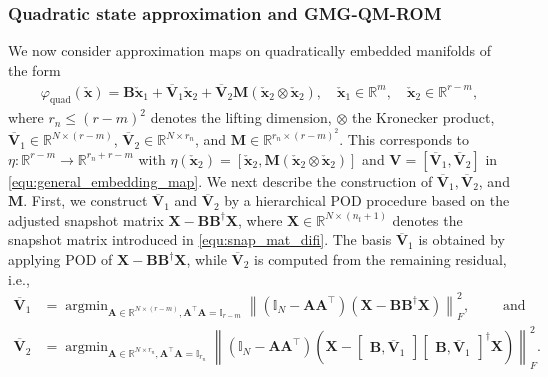 \documentclass{article}
\newcommand{\argmin}{ \mathop{ \mathrm{argmin} } }
\newcommand{\bmA}{\bm{A}}
\newcommand{\bmV}{\bm{V}}
\newcommand{\bmB}{\bm{B}}
\newcommand{\bmM}{\bm{M}}
\newcommand{\bmX}{\bm{X}}
\newcommand{\R}{\mathbb{R}}
\newcommand{\stateRed}{\check{\bm x}}
\newcommand{\snapsize}{n_t}
\newcommand{\portsize}{m}
\newcommand{\FOMsize}{N}
\newcommand{\ROMsize}{r}
\newcommand{\nlsize}{r_n}
\newcommand{\approxfunc}{\varphi}
\newcommand{\VPODQMone}{\overline{\bmV}_{1}}
\newcommand{\VPODQMtwo}{\overline{\bmV}_{2}}
\newcommand{\GMG}{\textsf{GMG}\xspace}
\newcommand{\QM}{\textsf{QM}\xspace} %
\newcommand{\POD}{\textsf{POD}\xspace}
\newcommand{\ROM}{\textsf{ROM}\xspace}
\begin{document}
\subsubsection{Quadratic state approximation and \GMG-\QM-\ROM}
\label{Sec:GMGQMROM}
We now consider approximation maps on quadratically embedded manifolds of the form
	\begin{align}
		\label{equ:quadratic_approximation_with_M}
		\approxfunc_{\text{quad}}(\stateRed)
		=\bmB\stateRed_1+\VPODQMone\stateRed_2 + \VPODQMtwo\bmM(\stateRed_2\otimes \stateRed_2),
		\quad
		\stateRed_1\in\R^{\portsize},
		\quad
		\stateRed_2\in\R^{\ROMsize-\portsize},
	\end{align}
where $\nlsize\leq (\ROMsize-\portsize)^2$ denotes the lifting dimension, $\otimes$ the Kronecker product, $	\VPODQMone\in\R^{\FOMsize\times(\ROMsize-\portsize)}$,
$\VPODQMtwo\in\R^{\FOMsize\times \nlsize}$, and $\bmM\in\R^{\nlsize\times(\ROMsize-\portsize)^2}$.
This corresponds to $\eta : \R^{\ROMsize-\portsize} \rightarrow \R^{\nlsize+\ROMsize-\portsize}$ with $\eta( \stateRed_2)= [ \stateRed_2, \bmM(\stateRed_2\otimes \stateRed_2)]$ and $\bmV= [\VPODQMone, \VPODQMtwo]$ in \eqref{equ:general_embedding_map}.
We next describe the construction of $\VPODQMone, \VPODQMtwo$, and $\bmM$. 
First, we construct $\VPODQMone$ and $\VPODQMtwo$ by a hierarchical POD procedure based on the adjusted snapshot matrix $\bmX-\bmB\bmB^{\dagger}\bmX$, where $\bmX\in\R^{\FOMsize\times(\snapsize +1)}$ denotes the snapshot matrix introduced in \eqref{equ:snap_mat_difi}. The basis $\VPODQMone$ is obtained by applying \POD of $\bmX-\bmB\bmB^{\dagger}\bmX$, while $\VPODQMtwo$ is computed from the remaining residual, i.e., 
	\begin{align}
		\label{equ:construc_V_comb_A}
		\VPODQMone &= \argmin_{\bmA\in\R^{\FOMsize\times (\ROMsize-\portsize)},
			\bmA^{\top}\bmA=\mathbb{I}_{\ROMsize-\portsize}}
		\left\|\left(\mathbb{I}_{\FOMsize}-\bmA\bmA^{\top} \right) \left( \bmX-\bmB\bmB^{\dagger}\bmX \right) \right\|_F^2, \qquad \text{ and }& 
		\\
		\label{equ:construc_V_comb_B}
		\VPODQMtwo
		&= \argmin_{\bmA\in\R^{\FOMsize\times \nlsize},
			\bmA^{\top}\bmA=\mathbb{I}_{\nlsize}}
		\left\| \left(\mathbb{I}_{\FOMsize}-\bmA\bmA^{\top}\right)\left(\bmX-
		\begin{bmatrix}
			\bmB, \VPODQMone
		\end{bmatrix}
		\begin{bmatrix}
			\bmB, \VPODQMone
		\end{bmatrix}^{\dagger}
		\bmX\right)\right\|_F^2.&
	\end{align}
\end{document}
